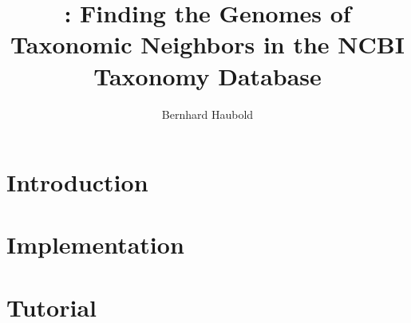 \documentclass[a4paper]{report}
\begin{document}
\pagestyle{noweb}

\title{: Finding the Genomes of Taxonomic Neighbors in
  the NCBI Taxonomy Database}
\author{Bernhard Haubold}
\maketitle
\tableofcontents
\chapter{Introduction}

\chapter{Implementation}






\chapter{Tutorial}



\end{document}
